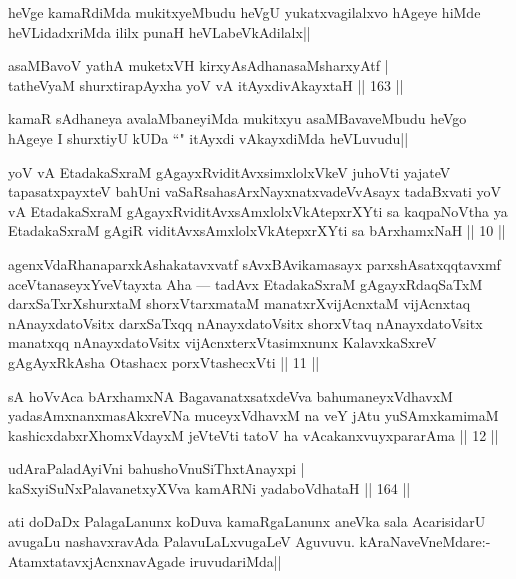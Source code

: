 \begin{artha}%
heVge kamaRdiMda mukitxyeMbudu heVgU yukatxvagilalxvo hAgeye hiMde heVLidadxriMda ililx punaH heVLabeVkAdilalx||
\end{artha}

\begin{shl}
asaMBavoV yathA muketxVH kirxyAsAdhanasaMsharxyAtf |\\
tatheVyaM shurxtirapAyxha yoV vA itAyxdivAkayxtaH \hfill || 163 ||
\end{shl}

\begin{artha}
kamaR sAdhaneya avalaMbaneyiMda mukitxyu asaMBavaveMbudu heVgo hAgeye I shurxtiyU kUDa ``\stext " itAyxdi vAkayxdiMda heVLuvudu||
\end{artha}

\begin{shl}
yoV vA EtadakaSxraM gAgayxRviditAvxsimxlolxVkeV juhoVti yajateV tapasatxpayxteV bahUni vaSaRsahasArxNayxnatxvadeVvAsayx tadaBxvati yoV vA EtadakaSxraM gAgayxRviditAvxsAmxlolxVkAtepxrXYti sa kaqpaNoV\s tha ya EtadakaSxraM gAgiR viditAvxsAmxlolxVkAtepxrXYti sa bArxhamxNaH || 10 ||

agenxVdaRhanaparxkAshakatavxvatf sAvxBAvikamasayx parxshAsatxqqtavxmf aceVtanaseyxYveVtayxta Aha — tadAvx EtadakaSxraM gAgayxRdaqSaTxM darxSaTxrXshurxtaM shorxVtarxmataM manatxrXvijAcnxtaM vijAcnxtaq nAnayxdatoV\s sitx darxSaTxqq nAnayxdatoV\s sitx shorxVtaq nAnayxdatoV\s sitx manatxqq nAnayxdatoV\s sitx vijAcnxterxVtasimxnunx KalavxkaSxreV gAgAyxRkAsha Otashacx porxVtashecxVti || 11 ||

sA hoVvAca bArxhamxNA BagavanatxsatxdeVva bahumaneyxVdhavxM yadasAmxnanxmasAkxreVNa muceyxVdhavxM na veY jAtu yuSAmxkamimaM kashicxdabxrXhomxVdayxM jeVteVti tatoV ha vAcakanxvuyxpararAma || 12 ||
\end{shl}


\begin{shl}
udAraPaladAyiVni bahushoV\s nuSiThxtAnayxpi |\\
kaSxyiSuNxPalavanetxyXVva kamARNi yadaboVdhataH \hfill || 164 ||
\end{shl}

\begin{artha}
ati doDaDx PalagaLanunx koDuva kamaRgaLanunx aneVka sala AcarisidarU avugaLu nashavxravAda PalavuLaLxvugaLeV Aguvuvu. kAraNaveVneMdare:- AtamxtatavxjAcnxnavAgade iruvudariMda||
\end{artha}

